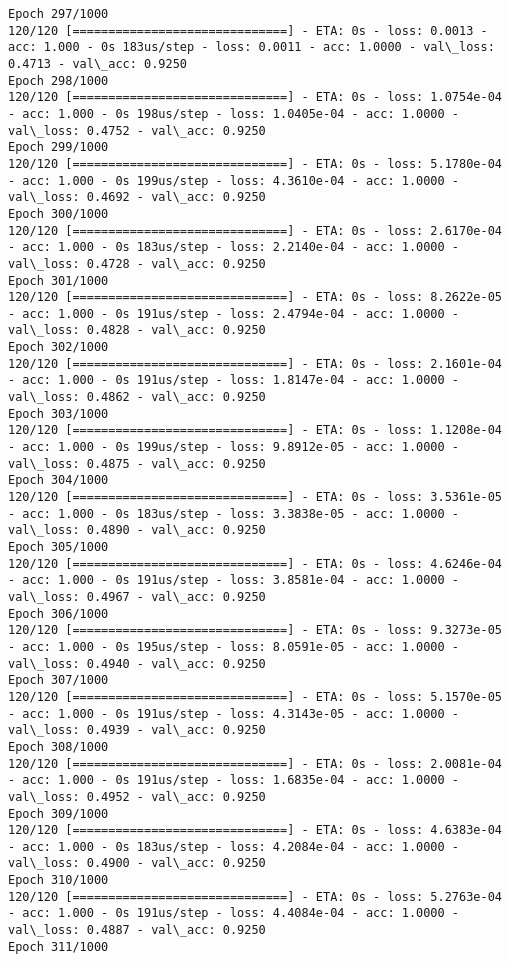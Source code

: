 \documentclass[11pt]{article}
\begin{document}
\begin{Verbatim}[commandchars=\\\{\}]
Epoch 297/1000
120/120 [==============================] - ETA: 0s - loss: 0.0013 - acc: 1.000 - 0s 183us/step - loss: 0.0011 - acc: 1.0000 - val\_loss: 0.4713 - val\_acc: 0.9250
Epoch 298/1000
120/120 [==============================] - ETA: 0s - loss: 1.0754e-04 - acc: 1.000 - 0s 198us/step - loss: 1.0405e-04 - acc: 1.0000 - val\_loss: 0.4752 - val\_acc: 0.9250
Epoch 299/1000
120/120 [==============================] - ETA: 0s - loss: 5.1780e-04 - acc: 1.000 - 0s 199us/step - loss: 4.3610e-04 - acc: 1.0000 - val\_loss: 0.4692 - val\_acc: 0.9250
Epoch 300/1000
120/120 [==============================] - ETA: 0s - loss: 2.6170e-04 - acc: 1.000 - 0s 183us/step - loss: 2.2140e-04 - acc: 1.0000 - val\_loss: 0.4728 - val\_acc: 0.9250
Epoch 301/1000
120/120 [==============================] - ETA: 0s - loss: 8.2622e-05 - acc: 1.000 - 0s 191us/step - loss: 2.4794e-04 - acc: 1.0000 - val\_loss: 0.4828 - val\_acc: 0.9250
Epoch 302/1000
120/120 [==============================] - ETA: 0s - loss: 2.1601e-04 - acc: 1.000 - 0s 191us/step - loss: 1.8147e-04 - acc: 1.0000 - val\_loss: 0.4862 - val\_acc: 0.9250
Epoch 303/1000
120/120 [==============================] - ETA: 0s - loss: 1.1208e-04 - acc: 1.000 - 0s 199us/step - loss: 9.8912e-05 - acc: 1.0000 - val\_loss: 0.4875 - val\_acc: 0.9250
Epoch 304/1000
120/120 [==============================] - ETA: 0s - loss: 3.5361e-05 - acc: 1.000 - 0s 183us/step - loss: 3.3838e-05 - acc: 1.0000 - val\_loss: 0.4890 - val\_acc: 0.9250
Epoch 305/1000
120/120 [==============================] - ETA: 0s - loss: 4.6246e-04 - acc: 1.000 - 0s 191us/step - loss: 3.8581e-04 - acc: 1.0000 - val\_loss: 0.4967 - val\_acc: 0.9250
Epoch 306/1000
120/120 [==============================] - ETA: 0s - loss: 9.3273e-05 - acc: 1.000 - 0s 195us/step - loss: 8.0591e-05 - acc: 1.0000 - val\_loss: 0.4940 - val\_acc: 0.9250
Epoch 307/1000
120/120 [==============================] - ETA: 0s - loss: 5.1570e-05 - acc: 1.000 - 0s 191us/step - loss: 4.3143e-05 - acc: 1.0000 - val\_loss: 0.4939 - val\_acc: 0.9250
Epoch 308/1000
120/120 [==============================] - ETA: 0s - loss: 2.0081e-04 - acc: 1.000 - 0s 191us/step - loss: 1.6835e-04 - acc: 1.0000 - val\_loss: 0.4952 - val\_acc: 0.9250
Epoch 309/1000
120/120 [==============================] - ETA: 0s - loss: 4.6383e-04 - acc: 1.000 - 0s 183us/step - loss: 4.2084e-04 - acc: 1.0000 - val\_loss: 0.4900 - val\_acc: 0.9250
Epoch 310/1000
120/120 [==============================] - ETA: 0s - loss: 5.2763e-04 - acc: 1.000 - 0s 191us/step - loss: 4.4084e-04 - acc: 1.0000 - val\_loss: 0.4887 - val\_acc: 0.9250
Epoch 311/1000

\end{Verbatim}
\end{document}
